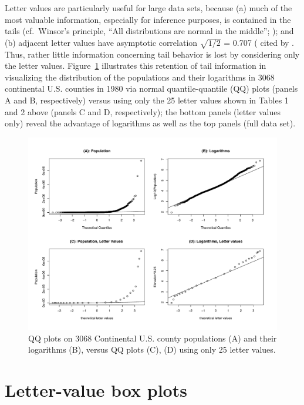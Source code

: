 \documentclass[oneside]{article}
\begin{document}
Letter values are particularly useful for large data sets, because (a) much of the most valuable information, especially for inference purposes, is contained in the tails (cf.\ Winsor's principle, ``All distributions are normal in the middle''; \citep[pg. 457]{tukey60}); and (b) adjacent letter values have asymptotic correlation $\sqrt{1/2}$ = 0.707 (\citet{mosteller46} cited by \citet[pg. 51--52]{dchlv}. Thus, rather little information concerning tail behavior is lost by considering only the letter values. Figure~\ref{qqpop4} illustrates this retention of tail information in visualizing the distribution of the populations and their logarithms in 3068 continental U.S. counties in 1980 via normal quantile-quantile (QQ) plots (panels A and B, respectively) versus using only the 25 letter values shown in Tables 1 and 2 above (panels C and D, respectively); the bottom panels (letter values only) reveal the advantage of logarithms as well as the top panels (full data set).

\begin{figure}[hbtp]
  \centering
  \includegraphics[width = 0.75 \linewidth]{qqpop4}

  \caption{QQ plots on 3068 Continental U.S. county populations (A) and their
  logarithms (B), versus QQ plots (C), (D) using only 25 letter values.}
  \label{qqpop4}
\end{figure}

\section{Letter-value box plots}
\label{sec:lv-boxplots}
\end{document}
